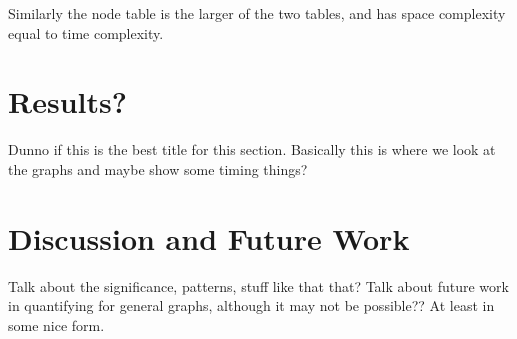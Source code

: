 \documentclass{article}
\begin{document}
Similarly the node table is the larger of the two tables, and has space
complexity equal to time complexity.

\section{Results?}

Dunno if this is the best title for this section. Basically this is
where we look at the graphs and maybe show some timing things?

\section{Discussion and Future Work}

Talk about the significance, patterns, stuff like that that? Talk
about future work in quantifying for general graphs, although it may
not be possible?? At least in some nice form.



\end{document}
